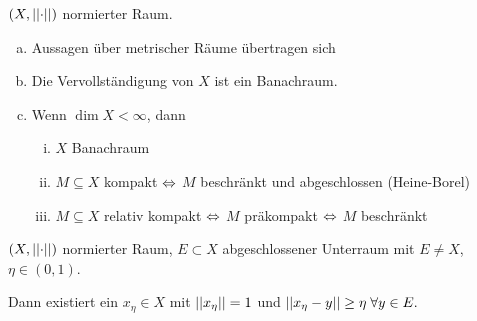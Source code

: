 \documentclass[ngerman]{report}
\begin{document}
	\begin{bem}[Fakten]
		$(X,\left\lvert \left\lvert \cdot \right\rvert \right\rvert)$ normierter Raum.
		\begin{enumerate}[a)]
			\item Aussagen über metrischer Räume übertragen sich
			\item Die Vervollständigung von $X$ ist ein Banachraum.
			\item Wenn $\dim X < \infty$, dann
				\begin{enumerate}[i)]
					\item $X$ Banachraum
					\item $M\subseteq X$ kompakt $\overset{}{\Leftrightarrow}$ $M$ beschränkt und abgeschlossen (Heine-Borel)
					\item $M\subseteq X$ relativ kompakt $\overset{}{\Leftrightarrow}$ $M$ präkompakt  $\overset{}{\Leftrightarrow}$ $M$ beschränkt
				\end{enumerate}
		\end{enumerate}
	\end{bem}

	\begin{lemma}%
		$(X,\left\lvert \left\lvert \cdot \right\rvert \right\rvert)$ normierter Raum, $E\subset X$ abgeschlossener Unterraum mit $E \not = X$, $\eta\in (0,1)$. \par
		Dann existiert ein $x_\eta \in X$ mit $\left\lvert \left\lvert x_\eta \right\rvert \right\rvert = 1$ und $\left\lvert \left\lvert x_\eta - y \right\rvert \right\rvert \geq \eta \; \forall y\in E.$
	\end{lemma}
\end{document}
